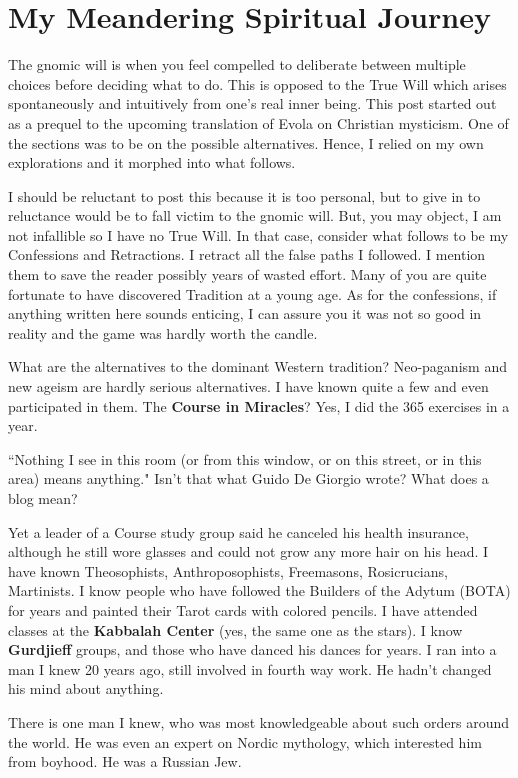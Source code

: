 \section{My Meandering Spiritual Journey}

The gnomic will is when you feel compelled to deliberate between multiple choices before deciding what to do. This is opposed to the True Will which arises spontaneously and intuitively from one's real inner being. This post started out as a prequel to the upcoming translation of Evola on Christian mysticism. One of the sections was to be on the possible alternatives. Hence, I relied on my own explorations and it morphed into what follows.

I should be reluctant to post this because it is too personal, but to give in to reluctance would be to fall victim to the gnomic will. But, you may object, I am not infallible so I have no True Will. In that case, consider what follows to be my Confessions and Retractions. I retract all the false paths I followed. I mention them to save the reader possibly years of wasted effort. Many of you are quite fortunate to have discovered Tradition at a young age. As for the confessions, if anything written here sounds enticing, I can assure you it was not so good in reality and the game was hardly worth the candle.

What are the alternatives to the dominant Western tradition? Neo-paganism and new ageism are hardly serious alternatives. I have known quite a few and even participated in them. The \textbf{Course in Miracles}? Yes, I did the 365 exercises in a year.

``Nothing I see in this room (or from this window, or on this street, or in this area) means anything." Isn't that what Guido De Giorgio wrote? What does a blog mean?

Yet a leader of a Course study group said he canceled his health insurance, although he still wore glasses and could not grow any more hair on his head. I have known Theosophists, Anthroposophists, Freemasons, Rosicrucians, Martinists. I know people who have followed the Builders of the Adytum (BOTA) for years and painted their Tarot cards with colored pencils. I have attended classes at the \textbf{Kabbalah Center} (yes, the same one as the stars). I know \textbf{Gurdjieff} groups, and those who have danced his dances for years. I ran into a man I knew 20 years ago, still involved in fourth way work. He hadn't changed his mind about anything.

There is one man I knew, who was most knowledgeable about such orders around the world. He was even an expert on Nordic mythology, which interested him from boyhood. He was a Russian Jew.

